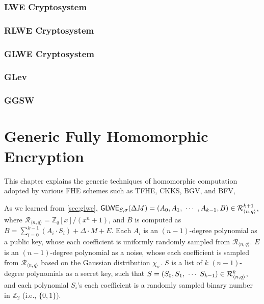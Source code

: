 \documentclass[11pt]{article}
\begin{document}
\clearpage

\section{LWE Cryptosystem}
\label{sec:lwe}


\clearpage

\section{RLWE Cryptosystem}
\label{sec:rlwe}


\clearpage

\section{GLWE Cryptosystem} 
\label{sec:glwe}


\clearpage

\section{GLev}
\label{sec:glev}


\clearpage

\section{GGSW}
\label{sec:ggsw}


\clearpage


\part{Generic Fully Homomorphic Encryption}
\label{part:generic-fhe}

\renewcommand{\thesection}{C-\arabic{section}}
\setcounter{section}{0}

This chapter explains the generic techniques of homomorphic computation adopted by various FHE schemes such as TFHE, CKKS, BGV, and BFV,

As we learned from \autoref{sec:glwe}, $\textsf{GLWE}_{S,\sigma}(\Delta M) = (A_0, A_1, \text{ } \text{$\cdots$} \text{ } , A_{k-1}, B) \in \mathcal{R}_{\langle n, q \rangle }^{k + 1}$, where $\mathcal{R}_{\langle n,q \rangle} = \mathbb{Z}_q[x] / (x^n + 1)$, and $B$ is computed as $B = \sum\limits_{i=0}^{k-1}{(A_i \cdot S_i)} + \Delta \cdot M + E$. Each $A_i$ is an $(n-1)$-degree polynomial as a public key, whose each coefficient is uniformly randomly sampled from $\mathcal{R}_{\langle n, q \rangle }$. $E$ is an $(n-1)$-degree polynomial as a noise, whose each coefficient is sampled from $\mathcal{R}_{\langle n, q \rangle }$ based on the Gaussian distribution $\chi_\sigma$. $S$ is a list of $k$ $(n-1)$-degree polynomials as a secret key, such that $S = (S_0, S_1, \text{ } \text{$\cdots$} \text{ } S_{k-1} ) \in \mathcal{R}_{\langle n, q \rangle }^k$, and each polynomial $S_i$'s each coefficient is a randomly sampled binary number in $\mathbb{Z}_2$ (i.e., $\{0, 1\}$). 
\end{document}
